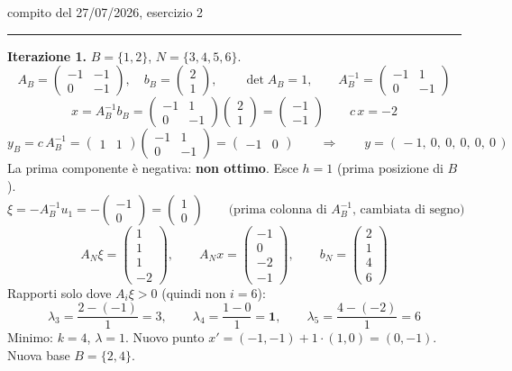 \documentclass[11pt,a4paper]{article}
\begin{document}
\begin{es}{compito del 27/07/2026, esercizio 2}
\medskip
\hrule
\medskip

\textbf{Iterazione 1.} \quad $B=\{1,2\}$, $N=\{3,4,5,6\}$.
\[
A_B = \begin{pmatrix} -1 & -1\\ 0 & -1\end{pmatrix},\quad
b_B = \begin{pmatrix} 2\\ 1\end{pmatrix},
\qquad
\det A_B = 1,
\qquad
A_B^{-1} = \begin{pmatrix} -1 & 1\\ 0 & -1\end{pmatrix}
\]
\[
x = A_B^{-1} b_B = \begin{pmatrix} -1 & 1\\ 0 & -1\end{pmatrix}\begin{pmatrix}2\\1\end{pmatrix}
= \begin{pmatrix}-1\\-1\end{pmatrix}
\qquad c\,x = -2
\]
\[
y_B = c\,A_B^{-1} = \begin{pmatrix}1&1\end{pmatrix}\begin{pmatrix} -1 & 1\\ 0 & -1\end{pmatrix}
= \begin{pmatrix}-1 & 0\end{pmatrix}
\qquad\Longrightarrow\qquad y = (\,-1,\ 0,\ 0,\ 0,\ 0,\ 0\,)
\]
La prima componente è negativa: \textbf{non ottimo}. Esce $h = 1$ (prima posizione di $B$).
\[
\xi = -A_B^{-1} u_1 = -\begin{pmatrix}-1\\0\end{pmatrix} = \begin{pmatrix}1\\0\end{pmatrix}
\qquad\text{(prima colonna di } A_B^{-1}\text{, cambiata di segno)}
\]
\[
A_N \xi = \begin{pmatrix}1\\1\\1\\-2\end{pmatrix},
\qquad
A_N x = \begin{pmatrix}-1\\0\\-2\\-1\end{pmatrix},
\qquad
b_N = \begin{pmatrix}2\\1\\4\\6\end{pmatrix}
\]
Rapporti solo dove $A_i\xi > 0$ (quindi non $i=6$):
\[
\lambda_3 = \frac{2-(-1)}{1} = 3, \qquad
\lambda_4 = \frac{1-0}{1} = \mathbf{1}, \qquad
\lambda_5 = \frac{4-(-2)}{1} = 6
\]
Minimo: $k = 4$, $\lambda = 1$. Nuovo punto $x' = (-1,-1) + 1\cdot(1,0) = (0,-1)$.
Nuova base $B = \{2,4\}$.


\end{es}
\end{document}

